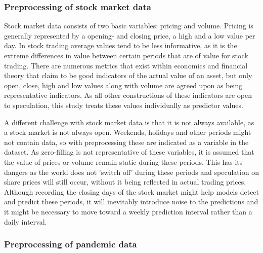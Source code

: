 \subsubsection{Preprocessing of stock market data}

Stock market data consists of two basic variables: pricing and volume. Pricing is generally represented by a opening- and closing price, a high and a low value per day. In stock trading average values tend to be less informative, as it is the extreme differences in value between certain periods that are of value for stock trading. There are numerous metrics that exist within economics and financial theory that claim to be good indicators of the actual value of an asset, but only open, close, high and low values along with volume are agreed upon as being representative indicators. As all other constructions of these indicators are open to speculation, this study treats these values individually as predictor values.

A different challenge with stock market data is that it is not always available, as a stock market is not always open. Weekends, holidays and other periods might not contain data, so with preprocessing these are indicated as a variable in the dataset. As zero-filling is not representative of these variables, it is assumed that the value of prices or volume remain static during these periods. This has its dangers as the world does not 'switch off' during these periods and speculation on share prices will still occur, without it being reflected in actual trading prices. Although recording the closing days of the stock market might help models detect and predict these periods, it will inevitably introduce noise to the predictions and it might be necessary to move toward a weekly prediction interval rather than a daily interval.

\subsubsection{Preprocessing of pandemic data}

